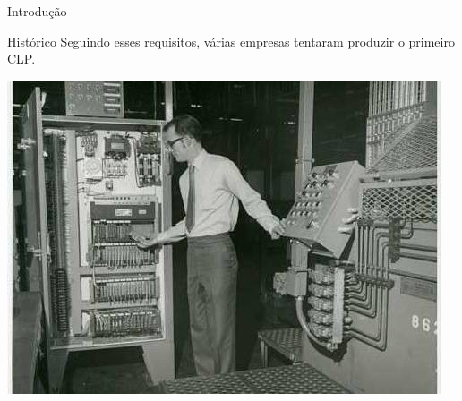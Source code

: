 \begin{frame}{Introdução}
	\begin{block}{Histórico}
		Seguindo esses requisitos, várias empresas tentaram produzir o primeiro CLP.
	\end{block}

	\centering
	\includegraphics[width=0.7\linewidth]{Figuras/Ch08/fig2}

\end{frame}


